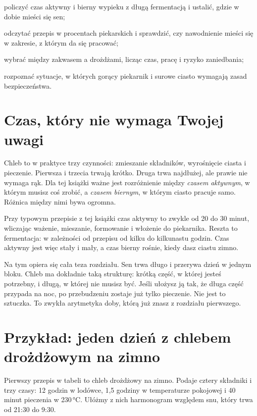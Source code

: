 
\begin{cele}
\item policzyć czas aktywny i bierny wypieku z długą fermentacją i ustalić, gdzie w dobie mieści się sen;
\item odczytać przepis w procentach piekarskich i sprawdzić, czy nawodnienie mieści się w zakresie, z którym da się pracować;
\item wybrać między zakwasem a drożdżami, licząc czas, pracę i ryzyko zaniedbania;
\item rozpoznać sytuacje, w których gorący piekarnik i surowe ciasto wymagają zasad bezpieczeństwa.
\end{cele}

\section{Czas, który nie wymaga Twojej uwagi}

Chleb to w praktyce trzy czynności: zmieszanie składników, wyrośnięcie ciasta i pieczenie. Pierwsza i trzecia trwają krótko. Druga trwa najdłużej, ale prawie nie wymaga rąk. Dla tej książki ważne jest rozróżnienie między \emph{czasem aktywnym}, w którym musisz coś zrobić, a \emph{czasem biernym}, w którym ciasto pracuje samo. Różnica między nimi bywa ogromna.

Przy typowym przepisie z tej książki czas aktywny to zwykle od 20 do 30 minut, wliczając ważenie, mieszanie, formowanie i włożenie do piekarnika. Reszta to fermentacja: w zależności od przepisu od kilku do kilkunastu godzin. Czas aktywny jest więc stały i mały, a czas bierny rośnie, kiedy dasz ciastu zimno.

Na tym opiera się cała teza rozdziału. Sen trwa długo i przerywa dzień w jednym bloku. Chleb ma dokładnie taką strukturę: krótką część, w której jesteś potrzebny, i długą, w której nie musisz być. Jeśli ułożysz ją tak, że długa część przypada na noc, po przebudzeniu zostaje już tylko pieczenie. Nie jest to sztuczka. To zwykła arytmetyka doby, którą już znasz z rozdziału pierwszego.

\section{Przykład: jeden dzień z chlebem drożdżowym na zimno}

Pierwszy przepis w tabeli to chleb drożdżowy na zimno. Podaje cztery składniki i trzy czasy: 12 godzin w lodówce, 1,5 godziny w temperaturze pokojowej i 40 minut pieczenia w 230\,°C. Ułóżmy z nich harmonogram względem snu, który trwa od 21:30 do 9:30.

